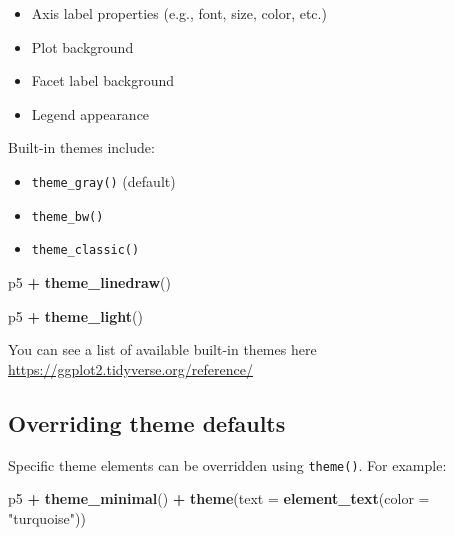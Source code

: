 \documentclass[]{book}
\newenvironment{Shaded}{\begin{snugshade}}{\end{snugshade}}
\newcommand{\KeywordTok}[1]{\textcolor[rgb]{0.13,0.29,0.53}{\textbf{#1}}}
\newcommand{\DataTypeTok}[1]{\textcolor[rgb]{0.13,0.29,0.53}{#1}}
\newcommand{\StringTok}[1]{\textcolor[rgb]{0.31,0.60,0.02}{#1}}
\newcommand{\OperatorTok}[1]{\textcolor[rgb]{0.81,0.36,0.00}{\textbf{#1}}}
\newcommand{\NormalTok}[1]{#1}
\providecommand{\tightlist}{%
  \setlength{\itemsep}{0pt}\setlength{\parskip}{0pt}}
\begin{document}
\begin{itemize}
\tightlist
\item
  Axis label properties (e.g., font, size, color, etc.)
\item
  Plot background
\item
  Facet label background
\item
  Legend appearance
\end{itemize}

Built-in themes include:

\begin{itemize}
\tightlist
\item
  \texttt{theme\_gray()} (default)
\item
  \texttt{theme\_bw()}
\item
  \texttt{theme\_classic()}
\end{itemize}

\begin{Shaded}
\begin{Highlighting}[]
\NormalTok{p5 }\OperatorTok{+}\StringTok{ }\KeywordTok{theme_linedraw}\NormalTok{()}
\end{Highlighting}
\end{Shaded}

\begin{Shaded}
\begin{Highlighting}[]
\NormalTok{p5 }\OperatorTok{+}\StringTok{ }\KeywordTok{theme_light}\NormalTok{()}
\end{Highlighting}
\end{Shaded}

You can see a list of available built-in themes here
\url{https://ggplot2.tidyverse.org/reference/}

\subsection{Overriding theme defaults}\label{overriding-theme-defaults}

Specific theme elements can be overridden using \texttt{theme()}. For
example:

\begin{Shaded}
\begin{Highlighting}[]
\NormalTok{p5 }\OperatorTok{+}\StringTok{ }\KeywordTok{theme_minimal}\NormalTok{() }\OperatorTok{+}
\StringTok{  }\KeywordTok{theme}\NormalTok{(}\DataTypeTok{text =} \KeywordTok{element_text}\NormalTok{(}\DataTypeTok{color =} \StringTok{"turquoise"}\NormalTok{))  }
\end{Highlighting}
\end{Shaded}
\end{document}
